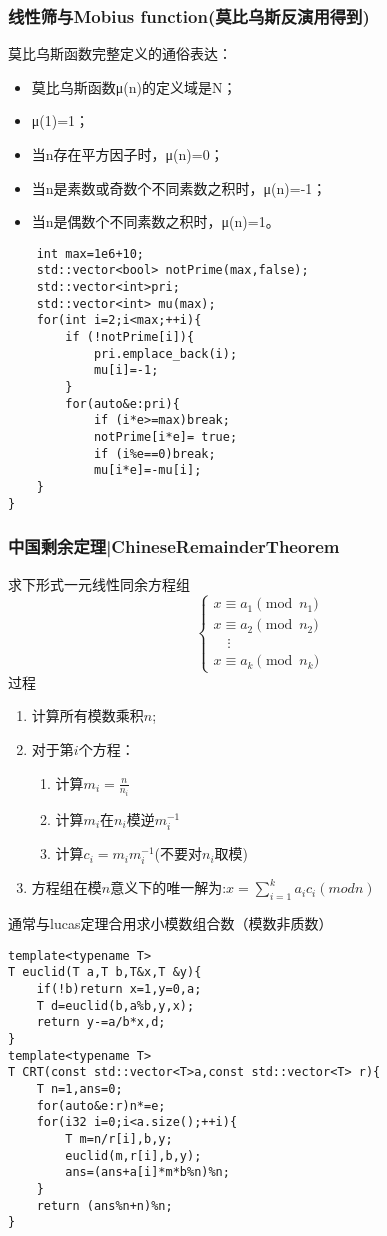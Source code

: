 \documentclass[UTF8]{ctexart}
\begin{document}
\subsubsection{线性筛与Mobius function(莫比乌斯反演用得到)}
莫比乌斯函数完整定义的通俗表达：
\begin{itemize}
    \item 莫比乌斯函数μ(n)的定义域是N；
    \item μ(1)=1；
    \item 当n存在平方因子时，μ(n)=0；
    \item 当n是素数或奇数个不同素数之积时，μ(n)=-1；
    \item 当n是偶数个不同素数之积时，μ(n)=1。
\end{itemize}
\begin{lstlisting}
    int max=1e6+10;
    std::vector<bool> notPrime(max,false);
    std::vector<int>pri;
    std::vector<int> mu(max);
    for(int i=2;i<max;++i){
        if (!notPrime[i]){
            pri.emplace_back(i);
            mu[i]=-1;
        }
        for(auto&e:pri){
            if (i*e>=max)break;
            notPrime[i*e]= true;
            if (i%e==0)break;
            mu[i*e]=-mu[i];
    }
}
\end{lstlisting}
\subsubsection{中国剩余定理|ChineseRemainderTheorem}
求下形式一元线性同余方程组
$$
\begin{cases}
    x \equiv a_1 \pmod{n_1} \\
    x \equiv a_2 \pmod{n_2} \\
    \quad \vdots \\
    x \equiv a_k \pmod{n_k}
\end{cases}
$$
过程
\begin{enumerate}
    \item 计算所有模数乘积$n$;
    \item 对于第$i$个方程：
        \begin{enumerate}
            \item 计算$m_i = \frac{n}{n_i}$
            \item 计算$m_i$在$n_i$模逆$m_i^{-1}$
            \item 计算$c_i=m_im_i^{-1}$(不要对$n_i$取模)
        \end{enumerate}
    \item 方程组在模$n$意义下的唯一解为:$x=\sum_{i=1}^{k}a_ic_i(mod n)$
\end{enumerate}
通常与lucas定理合用求小模数组合数（模数非质数）
\begin{lstlisting}
template<typename T>
T euclid(T a,T b,T&x,T &y){
    if(!b)return x=1,y=0,a;
    T d=euclid(b,a%b,y,x);
    return y-=a/b*x,d;
}
template<typename T>
T CRT(const std::vector<T>a,const std::vector<T> r){
    T n=1,ans=0;
    for(auto&e:r)n*=e;
    for(i32 i=0;i<a.size();++i){
        T m=n/r[i],b,y;
        euclid(m,r[i],b,y);
        ans=(ans+a[i]*m*b%n)%n;
    }
    return (ans%n+n)%n;
}
\end{lstlisting}
\end{document}
